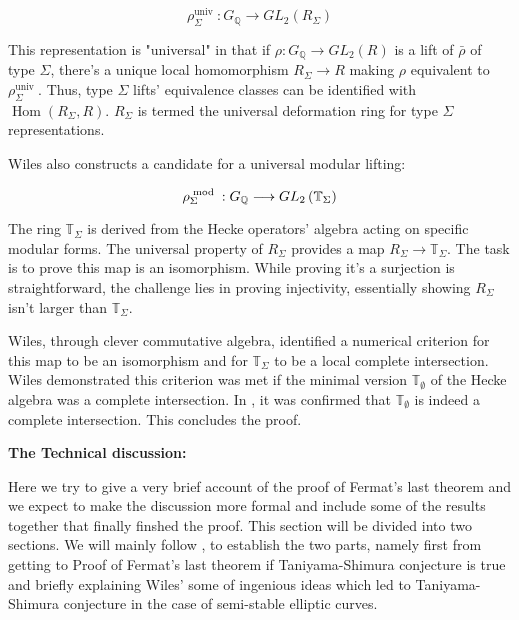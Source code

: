 \[ \rho_{\Sigma}^{\text {univ }}: G_{\mathbb{Q}} \longrightarrow G L_{2}\left(R_{\Sigma}\right) \]

This representation is "universal" in that if \( \rho: G_{\mathbb{Q}} \rightarrow G L_{2}(R) \) is a lift of \( \bar{\rho} \) of type \( \Sigma \), there's a unique local homomorphism \( R_{\Sigma} \longrightarrow R \) making \( \rho \) equivalent to \( \rho_{\Sigma}^{\text {univ }} \). Thus, type \( \Sigma \) lifts' equivalence classes can be identified with \( \operatorname{Hom}\left(R_{\Sigma}, R\right) \). \( R_{\Sigma} \) is termed the universal deformation ring for type \( \Sigma \) representations.

Wiles also constructs a candidate for a universal modular lifting:

\[ \rho_{\Sigma}^{\bmod }: G_{\mathbb{Q}} \longrightarrow G L_{2}\left(\mathbb{T}_{\Sigma}\right) \]

The ring \( \mathbb{T}_{\Sigma} \) is derived from the Hecke operators' algebra acting on specific modular forms. The universal property of \( R_{\Sigma} \) provides a map \( R_{\Sigma} \rightarrow \mathbb{T}_{\Sigma} \). The task is to prove this map is an isomorphism. While proving it's a surjection is straightforward, the challenge lies in proving injectivity, essentially showing \( R_{\Sigma} \) isn't larger than \( \mathbb{T}_{\Sigma} \).

Wiles, through clever commutative algebra, identified a numerical criterion for this map to be an isomorphism and for \( \mathbb{T}_{\Sigma} \) to be a local complete intersection. Wiles demonstrated this criterion was met if the minimal version \( \mathbb{T}_{\emptyset} \) of the Hecke algebra was a complete intersection. In \cite{taylorwiles1995b}, it was confirmed that \( \mathbb{T}_{\emptyset} \) is indeed a complete intersection. This concludes the proof. \\

\begin{center}
\textbf{The Technical discussion:}
\end{center}
Here we try to give a very brief account of the proof of Fermat's last theorem and we expect to make the discussion more formal and include some of the results together that finally finshed the proof. This section will be divided into two sections. We will mainly follow \cite{taylorwiles1995b}, \cite{ribet1990from} to establish the two parts, namely first from getting to Proof of Fermat's last theorem if Taniyama-Shimura conjecture is true and briefly explaining Wiles' some of ingenious ideas which led to Taniyama-Shimura conjecture in the case of semi-stable elliptic curves. \\

